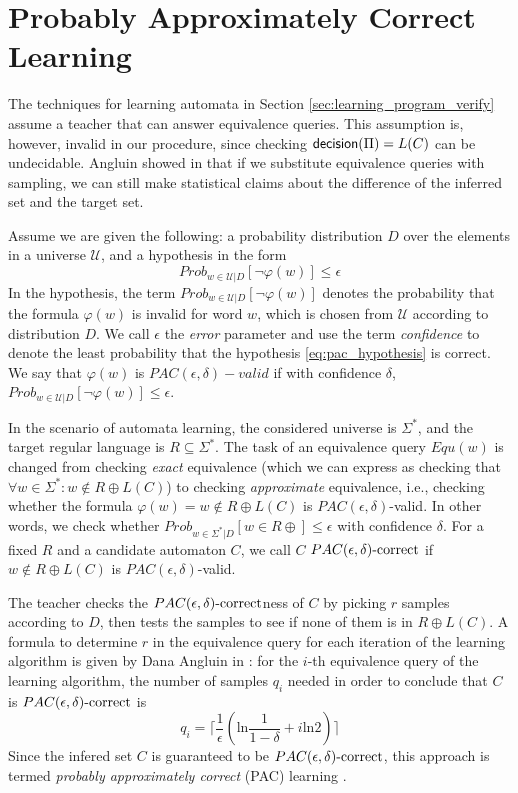 \section{Probably Approximately Correct Learning}\label{sec:pac_learning}

The techniques for learning automata in Section \ref{sec:learning_program_verify} assume a teacher that can answer equivalence queries. This assumption is, however, invalid in our procedure, since checking $\mathsf{decision}(\Pi) = L(C)$ can be undecidable. Angluin showed in \cite{Angluin88} that if we substitute equivalence queries with sampling, we can still make statistical claims about the difference of the inferred set and the target set. 

Assume we are given the following: a probability distribution $D$ over the elements in a universe $\mathcal{U}$, and a hypothesis in the form
\begin{equation}\label{eq:pac_hypothesis}
	Prob_{w \in \mathcal{U}|D} [\neg \varphi (w)] \leq \epsilon
\end{equation}
In the hypothesis, the term $Prob_{w \in \mathcal{U}|D} [\neg \varphi (w)]$ denotes the probability that the formula $\varphi(w)$ is invalid for word $w$, which is chosen from $\mathcal{U}$ according to distribution $D$. We call $\epsilon$ the \emph{error} parameter and use the term \emph{confidence} to denote the least probability that the hypothesis \ref{eq:pac_hypothesis} is correct. We say that $\varphi(w)$ is \emph{$PAC(\epsilon, \delta)-valid$} if with confidence $\delta$, $Prob_{w \in \mathcal{U}|D} [\neg \varphi (w)] \leq \epsilon$. 

In the scenario of automata learning, the considered universe is $\Sigma^\ast$, and the target regular language is $R \subseteq \Sigma^\ast$. The task of an equivalence query $Equ(w)$ is changed from checking \emph{exact} equivalence (which we can express as checking that $\forall w \in \Sigma^\ast : w \notin R \oplus L(C)$) to checking \emph{approximate} equivalence, i.e., checking whether the formula $\varphi(w) = w \notin R \oplus L(C)$ is $PAC(\epsilon, \delta)$-valid. In other words, we check whether $Prob_{w \in \Sigma^\ast|D} [w \in R \oplus] \leq \epsilon$ with confidence $\delta$. For a fixed $R$ and a candidate automaton $C$, we call $C$ \emph{$PAC(\epsilon, \delta)\text{-correct}$} if $w \notin R \oplus L(C)$ is $PAC(\epsilon, \delta)$-valid.

The teacher checks the $PAC(\epsilon, \delta)\text{-correct}$ness of $C$ by picking $r$ samples according to $D$, then tests the samples to see if none of them is in $R \oplus L(C)$. A formula to determine $r$ in the equivalence query for each iteration of the learning algorithm is given by Dana Angluin in \cite{Angluin87}: for the $i$-th equivalence query of the learning algorithm, the number of samples $q_i$ needed in order to conclude that $C$ is $PAC(\epsilon, \delta)\text{-correct}$ is
\begin{equation}
	q_i = \lceil \frac{1}{\epsilon} (\text{ln} \frac{1}{1-\delta} + i \text{ln}2) \rceil
\end{equation}
Since the infered set $C$ is guaranteed to be $PAC(\epsilon, \delta)\text{-correct}$, this approach is termed \emph{probably approximately correct} (PAC) learning \cite{Valiant84}.